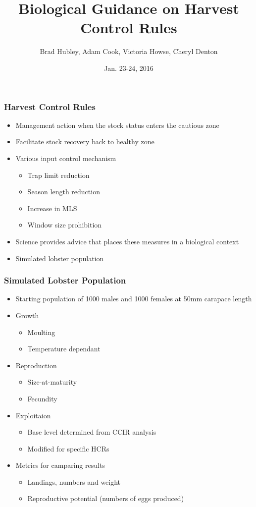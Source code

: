 \documentclass{beamer}
\title[HCR Guidance]{Biological Guidance on Harvest Control Rules}
\author[Hubley, Cook, Howse and Denton]{Brad Hubley, Adam Cook, Victoria Howse, Cheryl Denton}
\institute[DFO]{Science Branch, Fisheries and Oceans Canada}
\date{Jan. 23-24, 2016}
\begin{document}
 
\frame{\titlepage}
 

\begin{frame}
\frametitle{Harvest Control Rules}

\begin{itemize}
\item Management action when the stock status enters the cautious zone 
\item Facilitate stock recovery back to healthy zone 
\item Various input control mechanism
\begin{itemize}
\item Trap limit reduction
\item Season length reduction
\item Increase in MLS
\item Window size prohibition
\end{itemize}
\item Science provides advice that places these measures in a biological context 
\item Simulated lobster population
\end{itemize}

\end{frame}


\begin{frame}
\frametitle{Simulated Lobster Population}
    \begin{itemize}
    \item Starting population of 1000 males and 1000 females at 50mm carapace length 
    \item Growth 
    \begin{itemize}
        \item Moulting
        \item Temperature dependant
    \end{itemize}
    \item Reproduction
    \begin{itemize}
        \item Size-at-maturity
        \item Fecundity
    \end{itemize}
    \item Exploitaion
    \begin{itemize}
        \item Base level determined from CCIR analysis
        \item Modified for specific HCRs
    \end{itemize}
    \item Metrics for camparing results
    \begin{itemize}
        \item Landings, numbers and weight
        \item Reproductive potential (numbers of eggs produced)
    \end{itemize}
    \end{itemize}
\end{frame}
\end{document}
